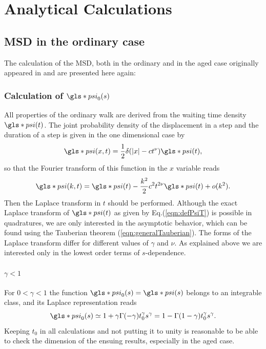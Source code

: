 \chapter{Analytical Calculations}

\section{MSD in the ordinary case}

The calculation of the MSD, both in the ordinary and in the aged case originally appeared in 
\cite{bothe} 
and are presented here again:

\subsection*{Calculation of $\gls*{psi}_0(s)$}

All properties of the ordinary walk are derived from the waiting time density $\gls*{psi}(t)$. The joint probability density of the displacement in a step and the duration of a step is given in the one dimensional case by
%
\begin{equation}
 \gls*{psi}(x,t) = \frac{1}{2} \delta(|x| - ct^\nu ) \gls*{psi}(t),
\end{equation}
%
so that the Fourier transform of this function in the $x$ variable reads
\begin{equation}
 \gls*{psi}(k,t) = \gls*{psi}(t) - \frac{k^2}{2} c^2 t^{2 \nu} \gls*{psi}(t) + o(k^2). 
\end{equation}
%
Then the Laplace transform in $t$ should be performed.  Although the exact Laplace transform of $\gls*{psi}(t)$ as given by Eq.(\ref{eqn:defPsiT}) is possible in quadratures, we are only interested in the asymptotic behavior, which can be found using the Tauberian theorem (\ref{eqn:generalTauberian}). The forms of the Laplace transform 
differ for different values of $\gamma$ and $\nu$. As explained above we are interested only in the lowest order terms of $s$-dependence. 

\subsubsection*{$ \gamma<1$}
For $0<\gamma <1$ the function $ \gls*{psi}_0(s) = \gls*{psi}(s)$ belongs to an integrable class, and its Laplace representation reads
\begin{equation}
 \gls*{psi}_0(s) \simeq 1 + \gamma \Gamma(-\gamma) t_0^\gamma s^\gamma 
 = 1-\Gamma(1-\gamma) t_0^\gamma s^\gamma. \label{eqn:psi0GammaSmall}
\end{equation}
Keeping $t_0$ in all calculations and not putting it to unity is reasonable to be able to check the dimension of the ensuing results, especially in the aged case. 

